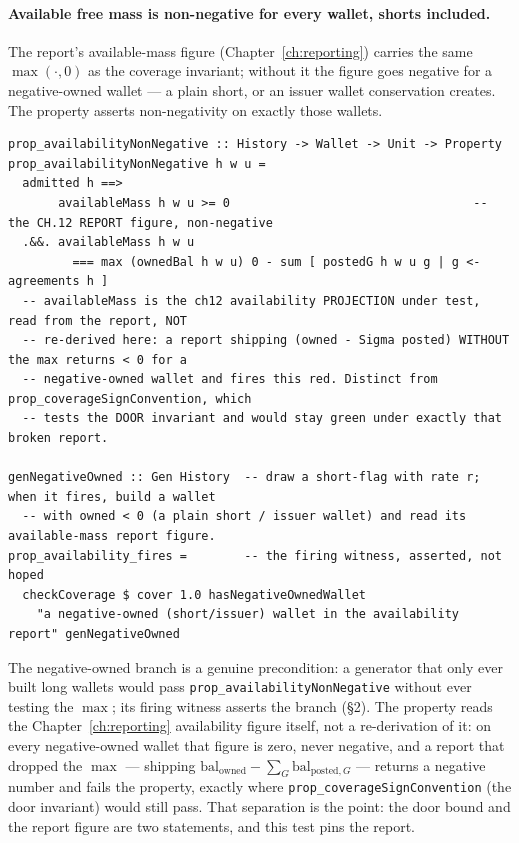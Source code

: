 \documentclass[11pt,a4paper]{article}
\begin{document}
\paragraph{Available free mass is non-negative for every wallet, shorts included.}
The report's available-mass figure (Chapter~\ref{ch:reporting}) carries the same
$\max(\cdot,0)$ as the coverage invariant; without it the figure goes negative for a
negative-owned wallet --- a plain short, or an issuer wallet conservation creates. The
property asserts non-negativity on exactly those wallets.

\begin{lstlisting}
prop_availabilityNonNegative :: History -> Wallet -> Unit -> Property
prop_availabilityNonNegative h w u =
  admitted h ==>
       availableMass h w u >= 0                                  -- the CH.12 REPORT figure, non-negative
  .&&. availableMass h w u
         === max (ownedBal h w u) 0 - sum [ postedG h w u g | g <- agreements h ]
  -- availableMass is the ch12 availability PROJECTION under test, read from the report, NOT
  -- re-derived here: a report shipping (owned - Sigma posted) WITHOUT the max returns < 0 for a
  -- negative-owned wallet and fires this red. Distinct from prop_coverageSignConvention, which
  -- tests the DOOR invariant and would stay green under exactly that broken report.

genNegativeOwned :: Gen History  -- draw a short-flag with rate r; when it fires, build a wallet
  -- with owned < 0 (a plain short / issuer wallet) and read its available-mass report figure.
prop_availability_fires =        -- the firing witness, asserted, not hoped
  checkCoverage $ cover 1.0 hasNegativeOwnedWallet
    "a negative-owned (short/issuer) wallet in the availability report" genNegativeOwned
\end{lstlisting}

The negative-owned branch is a genuine precondition: a generator that only ever built long wallets
would pass \texttt{prop\_availabilityNonNegative} without ever testing the $\max$; its firing
witness asserts the branch (\S 2). The property reads the Chapter~\ref{ch:reporting} availability
figure itself, not a re-derivation of it: on every negative-owned wallet that figure is zero, never
negative, and a report that dropped the $\max$ --- shipping $\mathrm{bal}_{\text{owned}}-\sum_G
\mathrm{bal}_{\text{posted},G}$ --- returns a negative number and fails the property, exactly where
\texttt{prop\_coverageSignConvention} (the door invariant) would still pass. That separation is the
point: the door bound and the report figure are two statements, and this test pins the report.
\end{document}

